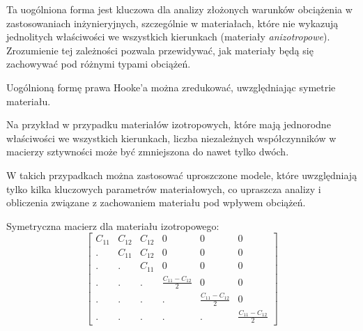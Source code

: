 \hspace{1.5cm} Ta uogólniona forma jest kluczowa dla analizy złożonych warunków obciążenia w zastosowaniach inżynieryjnych, szczególnie w materiałach, które nie wykazują jednolitych właściwości we wszystkich kierunkach (materiały \textit{anizotropowe}). Zrozumienie tej zależności pozwala przewidywać, jak materiały będą się zachowywać pod różnymi typami obciążeń.

\hspace{1.5cm} Uogólnioną formę prawa Hooke'a można zredukować, uwzględniając symetrie materiału. 

\hspace{1.5cm} Na przykład w przypadku materiałów izotropowych, które mają jednorodne właściwości we wszystkich kierunkach, liczba niezależnych współczynników w macierzy sztywności może być zmniejszona do nawet tylko dwóch. 

\hspace{1.5cm} W takich przypadkach można zastosować uproszczone modele, które uwzględniają tylko kilka kluczowych parametrów materiałowych, co upraszcza analizy i obliczenia związane z zachowaniem materiału pod wpływem obciążeń.

Symetryczna macierz dla materiału izotropowego:
$$
\begin{bmatrix}
C_{11} & C_{12} & C_{12} & 0 & 0 & 0 \\
. & C_{11} & C_{12} & 0 & 0 & 0 \\
. & . & C_{11} & 0 & 0 & 0 \\
. & . & . & \frac{C_{11} - C_{12}}{2} & 0 & 0 \\
. & . & . & . & \frac{C_{11} - C_{12}}{2} & 0 \\
. & . & . & . & . & \frac{C_{11} - C_{12}}{2}
\end{bmatrix}
$$

